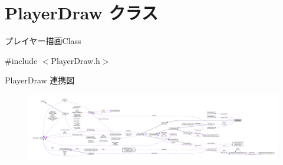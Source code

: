 \hypertarget{class_player_draw}{}\section{Player\+Draw クラス}
\label{class_player_draw}


プレイヤー描画\+Class  




{\ttfamily \#include $<$Player\+Draw.\+h$>$}



Player\+Draw 連携図\nopagebreak
\begin{figure}[H]
\begin{center}
\leavevmode
\includegraphics[width=350pt]{class_player_draw__coll__graph}
\end{center}
\end{figure}

